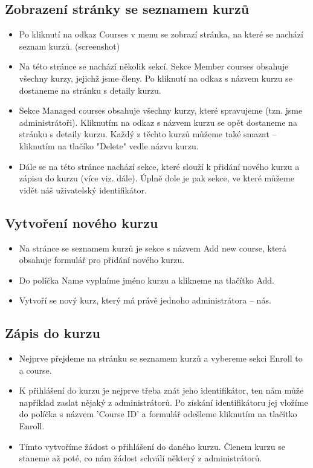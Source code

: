 \subsection{Zobrazení stránky se seznamem kurzů}

\begin{itemize}
	\item Po kliknutí na odkaz Courses v menu se zobrazí stránka, na které se nachází seznam kurzů. (screenshot)
	\item Na této stránce se nachází několik sekcí. Sekce Member courses obsahuje všechny kurzy, jejichž jsme členy. Po kliknutí na odkaz s názvem kurzu se dostaneme na stránku s detaily kurzu.
	\item Sekce Managed courses obsahuje všechny kurzy, které spravujeme (tzn. jsme administrátoři). Kliknutím na odkaz s názvem kurzu se opět dostaneme na stránku s detaily kurzu. Každý z těchto kurzů můžeme také smazat -- kliknutím na tlačíko "Delete" vedle názvu kurzu.
	\item Dále se na této stránce nachází sekce, které slouží k přidání nového kurzu a zápisu do kurzu (více viz. dále). Úplně dole je pak sekce, ve které můžeme vidět náš uživatelský identifikátor.
\end{itemize}

\subsection{Vytvoření nového kurzu}

\begin{itemize}
	\item Na stránce se seznamem kurzů je sekce s názvem Add new course, která obsahuje formulář pro přidání nového kurzu.
	\item Do políčka Name vyplníme jméno kurzu a klikneme na tlačítko Add.
	\item Vytvoří se nový kurz, který má právě jednoho administrátora -- nás.
\end{itemize}

\subsection{Zápis do kurzu}

\begin{itemize}
	\item Nejprve přejdeme na stránku se seznamem kurzů a vybereme sekci Enroll to a course.
	\item K přihlášení do kurzu je nejprve třeba znát jeho identifikátor, ten nám může například zaslat nějaký z administrátorů. Po získání identifikátoru jej vložíme do políčka s názvem 'Course ID' a formulář odešleme kliknutím na tlačítko Enroll.
	\item Tímto vytvoříme žádost o přihlášení do daného kurzu. Členem kurzu se staneme až poté, co nám žádost schválí některý z administrátorů.
\end{itemize}

